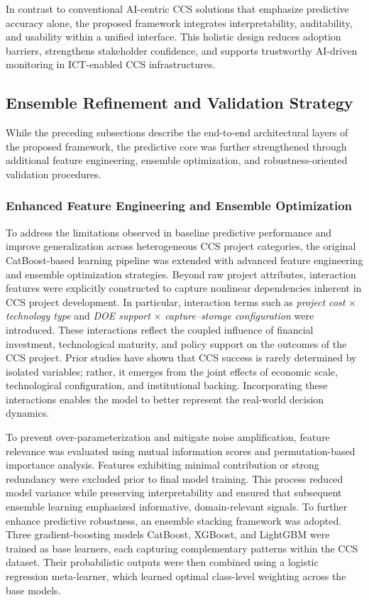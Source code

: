 \documentclass[conference]{IEEEtran}
\begin{document}
In contrast to conventional AI-centric CCS solutions that emphasize predictive accuracy alone, the proposed framework integrates interpretability, auditability, and usability within a unified interface. This holistic design reduces adoption barriers, strengthens stakeholder confidence, and supports trustworthy AI-driven monitoring in ICT-enabled CCS infrastructures.

\subsection{Ensemble Refinement and Validation Strategy}

While the preceding subsections describe the end-to-end architectural layers of the proposed framework, the predictive core was further strengthened through additional feature engineering, ensemble optimization, and robustness-oriented validation procedures.

\subsubsection {\textbf{Enhanced Feature Engineering and Ensemble Optimization}} To address the limitations observed in baseline predictive performance and improve generalization across heterogeneous CCS project categories, the original CatBoost-based learning pipeline was extended with advanced feature engineering and ensemble optimization strategies. Beyond raw project attributes, interaction features were explicitly constructed to capture nonlinear dependencies inherent in CCS project development. In particular, interaction terms such as \textit{project cost} $\times$ \textit{technology type} and \textit{DOE support} $\times$ \textit{capture--storage configuration} were introduced. These interactions reflect the coupled influence of financial investment, technological maturity, and policy support on the outcomes of the CCS project. Prior studies have shown that CCS success is rarely determined by isolated variables; rather, it emerges from the joint effects of economic scale, technological configuration, and institutional backing. Incorporating these interactions enables the model to better represent the real-world decision dynamics.

To prevent over-parameterization and mitigate noise amplification, feature relevance was evaluated using mutual information scores and permutation-based importance analysis. Features exhibiting minimal contribution or strong redundancy were excluded prior to final model training. This process reduced model variance while preserving interpretability and ensured that subsequent ensemble learning emphasized informative, domain-relevant signals. To further enhance predictive robustness, an ensemble stacking framework was adopted. Three gradient-boosting models CatBoost, XGBoost, and LightGBM were trained as base learners, each capturing complementary patterns within the CCS dataset. Their probabilistic outputs were then combined using a logistic regression meta-learner, which learned optimal class-level weighting across the base models.
\end{document}
